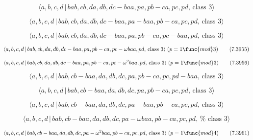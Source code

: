 \documentclass[10pt]{article}
\begin{document}
\begin{equation}
\langle a,b,c,d\,|\,bab,cb,da,db,dc-baa,pa,pb-ca,pc,pd,\,\text{class }%
3\rangle  \tag{7.3952}
\end{equation}

\begin{equation}
\langle a,b,c,d\,|\,bab,cb,da,db,dc-baa,pa-baa,pb-ca,pc,pd,\,\text{class }%
3\rangle  \tag{7.3953}
\end{equation}

\begin{equation}
\langle a,b,c,d\,|\,bab,cb,da,db,dc-baa,pa,pb-ca,pc-baa,pd,\,\text{class }%
3\rangle  \tag{7.3954}
\end{equation}

\begin{equation}
\langle a,b,c,d\,|\,bab,cb,da,db,dc-baa,pa,pb-ca,pc-\omega baa,pd,\,\text{%
class }3\rangle \;(p=1\func{mod}3)  \tag{7.3955}
\end{equation}

\begin{equation}
\langle a,b,c,d\,|\,bab,cb,da,db,dc-baa,pa,pb-ca,pc-\omega ^{2}baa,pd,\,%
\text{class }3\rangle \;(p=1\func{mod}3)  \tag{7.3956}
\end{equation}

\begin{equation}
\langle a,b,c,d\,|\,bab,cb-baa,da,db,dc,pa,pb-ca,pc,pd-baa,\,\text{class }%
3\rangle  \tag{7.3957}
\end{equation}

\begin{equation}
\langle a,b,c,d\,|\,bab,cb-baa,da,db,dc,pa,pb-ca,pc,pd,\,\text{class }%
3\rangle  \tag{7.3958}
\end{equation}

\begin{equation}
\langle a,b,c,d\,|\,bab,cb-baa,da,db,dc,pa-baa,pb-ca,pc,pd,\,\text{class }%
3\rangle  \tag{7.3959}
\end{equation}

\begin{equation}
\langle a,b,c,d\,|\,bab,cb-baa,da,db,dc,pa-\omega baa,pb-ca,pc,pd,\,\text{%
class }3\rangle  \tag{7.3960}
\end{equation}

\begin{equation}
\langle a,b,c,d\,|\,bab,cb-baa,da,db,dc,pa-\omega ^{2}baa,pb-ca,pc,pd,\,%
\text{class }3\rangle \;(p=1\func{mod}4)  \tag{7.3961}
\end{equation}
\end{document}
